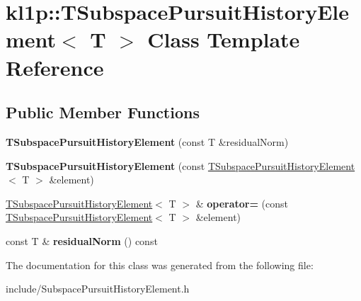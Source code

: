 \hypertarget{classkl1p_1_1TSubspacePursuitHistoryElement}{}\section{kl1p\+:\+:T\+Subspace\+Pursuit\+History\+Element$<$ T $>$ Class Template Reference}
\label{classkl1p_1_1TSubspacePursuitHistoryElement}
\subsection*{Public Member Functions}
\begin{DoxyCompactItemize}
\item 
{\bfseries T\+Subspace\+Pursuit\+History\+Element} (const T \&residual\+Norm)\hypertarget{classkl1p_1_1TSubspacePursuitHistoryElement_a9cb94706b83cc516f8c5c4e1bf66b077}{}\label{classkl1p_1_1TSubspacePursuitHistoryElement_a9cb94706b83cc516f8c5c4e1bf66b077}

\item 
{\bfseries T\+Subspace\+Pursuit\+History\+Element} (const \hyperlink{classkl1p_1_1TSubspacePursuitHistoryElement}{T\+Subspace\+Pursuit\+History\+Element}$<$ T $>$ \&element)\hypertarget{classkl1p_1_1TSubspacePursuitHistoryElement_a72be0f36bdd91a1c0954c9a984a5ea14}{}\label{classkl1p_1_1TSubspacePursuitHistoryElement_a72be0f36bdd91a1c0954c9a984a5ea14}

\item 
\hyperlink{classkl1p_1_1TSubspacePursuitHistoryElement}{T\+Subspace\+Pursuit\+History\+Element}$<$ T $>$ \& {\bfseries operator=} (const \hyperlink{classkl1p_1_1TSubspacePursuitHistoryElement}{T\+Subspace\+Pursuit\+History\+Element}$<$ T $>$ \&element)\hypertarget{classkl1p_1_1TSubspacePursuitHistoryElement_a6593fb2b6f8656ad2406503e3fb97109}{}\label{classkl1p_1_1TSubspacePursuitHistoryElement_a6593fb2b6f8656ad2406503e3fb97109}

\item 
const T \& {\bfseries residual\+Norm} () const \hypertarget{classkl1p_1_1TSubspacePursuitHistoryElement_ac3d53d214b572c282256af430b19ffd7}{}\label{classkl1p_1_1TSubspacePursuitHistoryElement_ac3d53d214b572c282256af430b19ffd7}

\end{DoxyCompactItemize}


The documentation for this class was generated from the following file\+:\begin{DoxyCompactItemize}
\item 
include/Subspace\+Pursuit\+History\+Element.\+h\end{DoxyCompactItemize}

